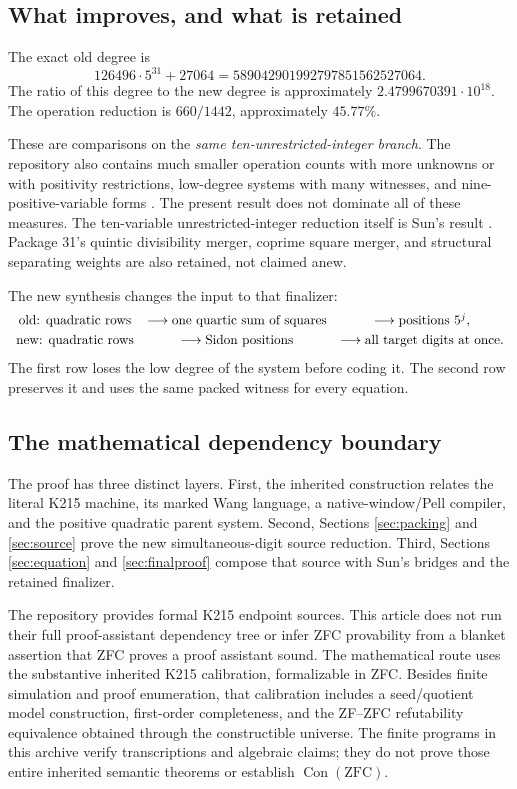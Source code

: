 \documentclass[11pt]{article}
\newcommand{\Con}{\operatorname{Con}}
\newcommand{\ZFC}{\mathrm{ZFC}}
\theoremstyle{definition}
\theoremstyle{remark}
\numberwithin{equation}{section}
\begin{document}
\subsection{What improves, and what is retained}

The exact old degree is
\[
126496\cdot5^{31}+27064
=589042901992797851562527064.
\]
The ratio of this degree to the new degree is approximately
\(2.4799670391\cdot10^{18}\). The operation reduction is
\(660/1442\), approximately \(45.77\%\).

These are comparisons on the \emph{same ten-unrestricted-integer branch}.
The repository also contains much smaller operation counts with more
unknowns or with positivity restrictions, low-degree systems with many
witnesses, and nine-positive-variable forms \cite{repo}. The present
result does not dominate all of these measures. The ten-variable
unrestricted-integer reduction itself is Sun's result \cite{sun2026}.
Package 31's quintic divisibility merger, coprime square merger, and
structural separating weights are also retained, not claimed anew.

The new synthesis changes the input to that finalizer:
\[
\begin{array}{c@{\quad}c@{\quad}c}
\text{old: quadratic rows}
 &\longrightarrow\text{one quartic sum of squares}
 &\longrightarrow\text{positions }5^j,\\[3pt]
\text{new: quadratic rows}
 &\longrightarrow\text{Sidon positions}
 &\longrightarrow\text{all target digits at once}.
\end{array}
\]
The first row loses the low degree of the system before coding it.
The second row preserves it and uses the same packed witness for every
equation.

\subsection{The mathematical dependency boundary}

The proof has three distinct layers.
First, the inherited construction relates the literal K215 machine,
its marked Wang language, a native-window/Pell compiler, and the positive
quadratic parent system. Second, Sections \ref{sec:packing} and
\ref{sec:source} prove the new simultaneous-digit source reduction.
Third, Sections \ref{sec:equation} and \ref{sec:finalproof} compose that
source with Sun's bridges and the retained finalizer.

The repository provides formal K215 endpoint sources. This article does
not run their full proof-assistant dependency tree or infer ZFC provability
from a blanket assertion that ZFC proves a proof assistant sound.
The mathematical route uses the substantive inherited K215 calibration,
formalizable in ZFC. Besides finite simulation and proof enumeration,
that calibration includes a seed/quotient model construction,
first-order completeness, and the ZF--ZFC refutability equivalence
obtained through the constructible universe. The finite programs in this archive verify
transcriptions and algebraic claims; they do not prove those entire
inherited semantic theorems or establish \(\Con(\ZFC)\).
\end{document}
